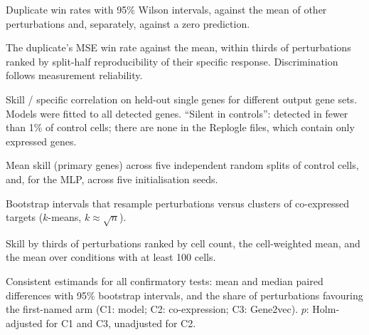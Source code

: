 \begin{table}[H]
\centering\scriptsize
\caption{Duplicate win rates with 95\% Wilson intervals, against the mean of other perturbations and, separately, against a zero prediction.}
\label{tab:discrimination}

\end{table}

\begin{table}[H]
\centering\scriptsize
\caption{The duplicate's MSE win rate against the mean, within thirds of perturbations ranked by split-half reproducibility of their specific response. Discrimination follows measurement reliability.}
\label{tab:discrel}

\end{table}

\begin{table}[H]
\centering\scriptsize
\caption{Skill / specific correlation on held-out single genes for different output gene sets. Models were fitted to all detected genes. ``Silent in controls'': detected in fewer than 1\% of control cells; there are none in the Replogle files, which contain only expressed genes.}
\label{tab:genesets}
\resizebox{\linewidth}{!}{}
\end{table}

\begin{table}[H]
\centering\scriptsize
\caption{Mean skill (primary genes) across five independent random splits of control cells, and, for the MLP, across five initialisation seeds.}
\label{tab:variability}

\end{table}

\begin{table}[H]
\centering\scriptsize
\caption{Bootstrap intervals that resample perturbations versus clusters of co-expressed targets ($k$-means, $k\approx\sqrt{n}$).}
\label{tab:block}
\resizebox{\linewidth}{!}{}
\end{table}

\begin{table}[H]
\centering\scriptsize
\caption{Skill by thirds of perturbations ranked by cell count, the cell-weighted mean, and the mean over conditions with at least 100 cells.}
\label{tab:cellcount}
\resizebox{\linewidth}{!}{}
\end{table}

\begin{table}[H]
\centering\scriptsize
\caption{Consistent estimands for all confirmatory tests: mean and median paired differences with 95\% bootstrap intervals, and the share of perturbations favouring the first-named arm (C1: model; C2: co-expression; C3: Gene2vec). $p$: Holm-adjusted for C1 and C3, unadjusted for C2.}
\label{tab:estimands}
\resizebox{\linewidth}{!}{}
\end{table}

